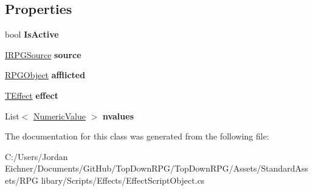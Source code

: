 \subsection*{Properties}
\begin{DoxyCompactItemize}
\item 
\hypertarget{class_effect_script_object_aa7393df152fc5f74e6e1090dee001506}{}bool {\bfseries Is\+Active}\label{class_effect_script_object_aa7393df152fc5f74e6e1090dee001506}

\item 
\hypertarget{class_effect_script_object_ae89ee99bf700ea056f51911687d648d1}{}\hyperlink{interface_i_r_p_g_source}{I\+R\+P\+G\+Source} {\bfseries source}\label{class_effect_script_object_ae89ee99bf700ea056f51911687d648d1}

\item 
\hypertarget{class_effect_script_object_a711373a035ce7590453b67f8d8033aa7}{}\hyperlink{class_r_p_g_object}{R\+P\+G\+Object} {\bfseries afflicted}\label{class_effect_script_object_a711373a035ce7590453b67f8d8033aa7}

\item 
\hypertarget{class_effect_script_object_ae7f6e96fbdbc25f50a1e3bbca60762fb}{}\hyperlink{class_t_effect}{T\+Effect} {\bfseries effect}\label{class_effect_script_object_ae7f6e96fbdbc25f50a1e3bbca60762fb}

\item 
\hypertarget{class_effect_script_object_ad036f8d1db5797ad6695e91d758c0861}{}List$<$ \hyperlink{class_effect_script_object_1_1_numeric_value}{Numeric\+Value} $>$ {\bfseries nvalues}\label{class_effect_script_object_ad036f8d1db5797ad6695e91d758c0861}

\end{DoxyCompactItemize}


The documentation for this class was generated from the following file\+:\begin{DoxyCompactItemize}
\item 
C\+:/\+Users/\+Jordan Eichner/\+Documents/\+Git\+Hub/\+Top\+Down\+R\+P\+G/\+Top\+Down\+R\+P\+G/\+Assets/\+Standard\+Assets/\+R\+P\+G libary/\+Scripts/\+Effects/Effect\+Script\+Object.\+cs\end{DoxyCompactItemize}
